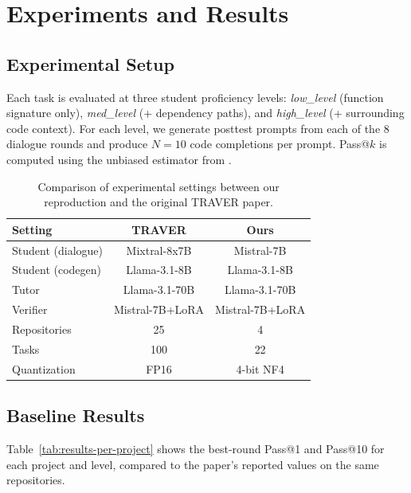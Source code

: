 \documentclass[11pt]{article}
\begin{document}
\section{Experiments and Results}

\subsection{Experimental Setup}

Each task is evaluated at three student proficiency levels: \textit{low\_level} (function signature only), \textit{med\_level} (+ dependency paths), and \textit{high\_level} (+ surrounding code context). For each level, we generate posttest prompts from each of the 8 dialogue rounds and produce $N{=}10$ code completions per prompt. Pass@$k$ is computed using the unbiased estimator from \citet{chen2021evaluating}.

\begin{table}[t]
  \centering
  \begin{tabular}{lcc}
    \toprule
    \textbf{Setting} & \textbf{TRAVER} & \textbf{Ours} \\
    \midrule
    Student (dialogue) & Mixtral-8x7B & Mistral-7B \\
    Student (codegen)  & Llama-3.1-8B & Llama-3.1-8B \\
    Tutor              & Llama-3.1-70B & Llama-3.1-70B \\
    Verifier           & Mistral-7B+LoRA & Mistral-7B+LoRA \\
    \midrule
    Repositories       & 25 & 4 \\
    Tasks              & 100 & 22 \\
    Quantization       & FP16 & 4-bit NF4 \\
    \bottomrule
  \end{tabular}
  \caption{Comparison of experimental settings between our reproduction and the original TRAVER paper.}
  \label{tab:stats}
\end{table}

\subsection{Baseline Results}

Table~\ref{tab:results-per-project} shows the best-round Pass@1 and Pass@10 for each project and level, compared to the paper's reported values on the same repositories.
\end{document}
